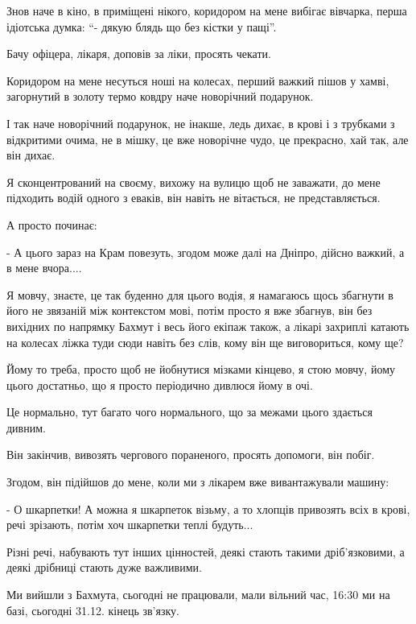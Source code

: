 Знов наче в кіно, в приміщені нікого, коридором на мене вибігає вівчарка, перша
ідіотська думка: \enquote{- дякую блядь що без кістки у пащі}. 

Бачу офіцера, лікаря, доповів за ліки, просять чекати. 

Коридором на мене несуться ноші на колесах, перший важкий пішов у хамві,
загорнутий в золоту термо ковдру наче новорічний подарунок. 

І так наче новорічний подарунок, не інакше, ледь дихає, в крові і з трубками з
відкритими очима, не в мішку, це вже новорічне чудо, це прекрасно, хай так, але
він дихає.  

Я сконцентрований на своєму, вихожу на вулицю щоб не заважати, до мене
підходить водій одного з еваків, він навіть не вітається, не представляється. 

А просто починає:

- А цього зараз на Крам повезуть, згодом може далі на Дніпро, дійсно важкий, а
в мене вчора....

Я мовчу, знаєте, це так буденно для цього водія, я намагаюсь щось збагнути в
його не звязаній між контекстом мові, потім просто я вже збагнув, він без
вихідних по напрямку Бахмут і весь його екіпаж також, а лікарі захриплі катають
на колесах ліжка туди сюди навіть без слів, кому він ще виговориться, кому ще? 

Йому то треба, просто щоб не йобнутися мізками кінцево, я стою мовчу, йому
цього достатньо, що я просто періодично дивлюся йому в очі.

Це нормально, тут багато чого нормального, що за межами цього здається дивним. 

Він закінчив, вивозять чергового пораненого, просять допомоги, він побіг.

Згодом, він підійшов до мене, коли ми з лікарем вже вивантажували машину:

- О шкарпетки! А можна я шкарпеток візьму, а то хлопців привозять всіх в крові,
речі зрізають, потім хоч шкарпетки теплі будуть...

Різні речі, набувають тут інших цінностей, деякі стають такими дріб'язковими, а
деякі дрібниці стають дуже важливими. 

Ми вийшли з Бахмута, сьогодні не працювали, мали вільний час, 16:30 ми на базі,
сьогодні 31.12. кінець зв'язку.

